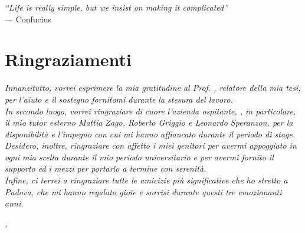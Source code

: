 
\cleardoublepage
{}
{}

\begin{flushright}{
	\slshape    
	``Life is really simple, but we insist on making it complicated''} \\ 
	\medskip
    --- Confucius
\end{flushright}


\bigskip

\begingroup
\let\clearpage\relax
\let\cleardoublepage\relax
\let\cleardoublepage\relax

\chapter*{Ringraziamenti}

\noindent \textit{Innanzitutto, vorrei esprimere la mia gratitudine al Prof. \myProf, relatore della mia tesi, per l'aiuto e il sostegno fornitomi durante la stesura del lavoro.}\\
\noindent \textit{In secondo luogo, vorrei ringraziare di cuore l'azienda ospitante, \myAzienda, in particolare, il mio tutor esterno Mattia Zago, Roberto Griggio e Leonardo Speranzon, per la disponibilità e l'impegno con cui mi hanno affiancato durante il periodo di stage.}\\

\noindent \textit{Desidero, inoltre, ringraziare con affetto i miei genitori per avermi appoggiato in ogni mia scelta durante il mio periodo universitario e per avermi fornito il supporto ed i mezzi per portarlo a termine con serenità.}\\

\noindent \textit{Infine, ci terrei a ringraziare tutte le amicizie più significative che ho stretto a Padova, che mi hanno regalato gioie e sorrisi durante questi tre emozionanti anni.}\\
\bigskip

\noindent\textit{\myLocation, \myTime}
\hfill \myName

\endgroup

